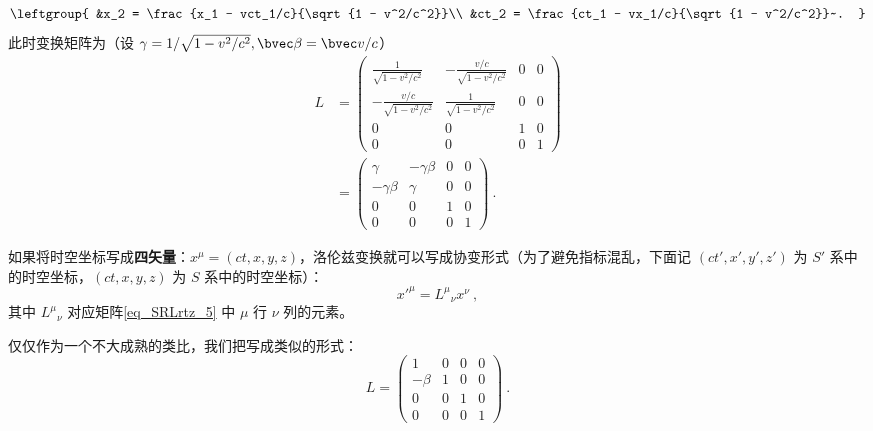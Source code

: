\begin{equation}
\leftgroup{
&x_2 = \frac{x_1 - vct_1/c}{\sqrt{1 - v^2/c^2}}\\
&ct_2 = \frac{ct_1 - vx_1/c}{\sqrt{1 - v^2/c^2}}~.
}
\end{equation}
此时变换矩阵为（设 $\gamma=1/\sqrt{1-v^2/c^2},\bvec \beta=\bvec v/c$）
\begin{equation}\label{eq_SRLrtz_5}
\begin{aligned}
L&=
\left(\begin{matrix}
\frac{1}{\sqrt{1-v^2/c^2}}& -\frac{v/c}{\sqrt{1-v^2/c^2}}& 0& 0\\
-\frac{v/c}{\sqrt{1-v^2/c^2}}& \frac{1}{\sqrt{1-v^2/c^2}}& 0& 0\\
0&0&1&0\\
0&0&0&1
\end{matrix}\right)\\
&=
\left(\begin{matrix}
\gamma& -\gamma\beta& 0& 0\\
-\gamma\beta& \gamma& 0& 0\\
0&0&1&0\\
0&0&0&1
\end{matrix}\right)~.
\end{aligned}
\end{equation}

如果将时空坐标写成\textbf{四矢量}：$x^{\mu}=(ct,x,y,z)$，洛伦兹变换就可以写成协变形式（为了避免指标混乱，下面记 $(ct',x',y',z')$ 为 $S'$ 系中的时空坐标，$(ct,x,y,z)$ 为 $S$ 系中的时空坐标）：
\begin{equation}
x'^{\mu}={L^\mu}_\nu x^\nu~,
\end{equation}
其中 ${L^\mu}_\nu$ 对应矩阵\autoref{eq_SRLrtz_5} 中 $\mu$ 行 $\nu$ 列的元素。

仅仅作为一个不大成熟的类比，我们把写成类似的形式：
$$
L=\left(\begin{matrix}
1& 0& 0& 0\\
-\beta& 1& 0& 0\\
0&0&1&0\\
0&0&0&1
\end{matrix}\right)~.
$$
